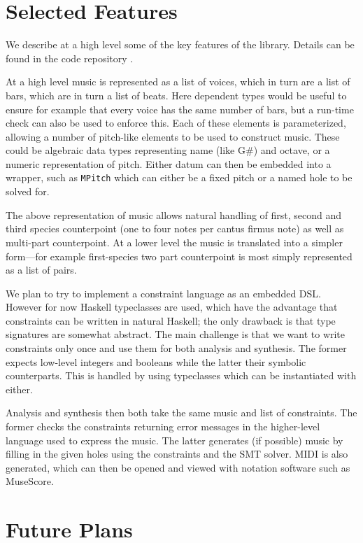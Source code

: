 \documentclass[sigplan,screen]{acmart}
\begin{document}
\section{Selected Features}

We describe at a high level some of the key features of the
library. Details can be found in the code repository
\citep{HaskellCounterpoint}.

At a high level music is represented as a list of voices, which in
turn are a list of bars, which are in turn a list of beats. Here
dependent types would be useful to ensure for example that every voice
has the same number of bars, but a run-time check can also be used to
enforce this. Each of these elements is parameterized, allowing a
number of pitch-like elements to be used to construct music. These
could be algebraic data types representing name (like G\#) and
octave, or a numeric representation of pitch. Either datum can then be
embedded into a wrapper, such as \texttt{MPitch} which can either be a
fixed pitch or a named hole to be solved for.

The above representation of music allows natural handling of first,
second and third species counterpoint (one to four notes per cantus
firmus note) as well as multi-part counterpoint. At a lower level the
music is translated into a simpler form---for example first-species
two part counterpoint is most simply represented as a list of pairs.

We plan to try to implement a constraint language as an embedded
DSL. However for now Haskell typeclasses are used, which have the
advantage that constraints can be written in natural Haskell; the only
drawback is that type signatures are somewhat abstract. The main
challenge is that we want to write constraints only once and use them
for both analysis and synthesis. The former expects low-level integers
and booleans while the latter their symbolic counterparts. This is
handled by using typeclasses which can be instantiated with either.

Analysis and synthesis then both take the same music and list of
constraints. The former checks the constraints returning error
messages in the higher-level language used to express the music. The
latter generates (if possible) music by filling in the given holes
using the constraints and the SMT solver. MIDI is also generated,
which can then be opened and viewed with notation software such as
MuseScore.

\section{Future Plans}
\end{document}
